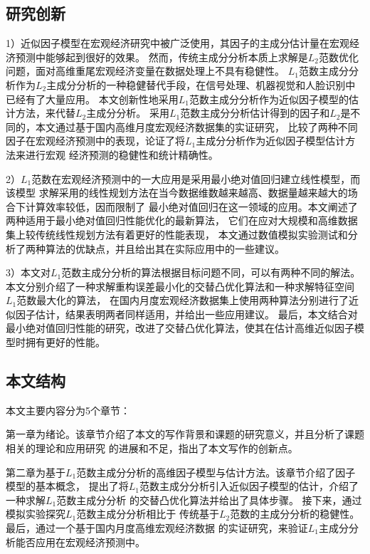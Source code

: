 \subsection{研究创新}
1）近似因子模型在宏观经济研究中被广泛使用，其因子的主成分估计量在宏观经济预测中能够起到很好的效果。
然而，传统主成分分析本质上求解是$L_2$范数优化问题，面对高维重尾宏观经济变量在数据处理上不具有稳健性。
$L_1$范数主成分分析作为$L_2$主成分分析的一种稳健替代手段，在信号处理、机器视觉和人脸识别中
已经有了大量应用。
本文创新性地采用$L_1$范数主成分分析作为近似因子模型的估计方法，来代替$L_2$主成分分析。
采用$L_1$范数主成分分析估计得到的因子和$L_2$是不同的，本文通过基于国内高维月度宏观经济数据集的实证研究，
比较了两种不同因子在宏观经济预测中的表现，论证了将$L_1$主成分分析作为近似因子模型估计方法来进行宏观
经济预测的稳健性和统计精确性。

2）$L_1$范数在宏观经济预测中的一大应用是采用最小绝对值回归建立线性模型，而该模型
求解采用的线性规划方法在当今数据维数越来越高、数据量越来越大的场合下计算效率较低，因而限制了
最小绝对值回归在这一领域的应用。本文阐述了两种适用于最小绝对值回归性能优化的最新算法，
它们在应对大规模和高维数据集上较传统线性规划方法有着更好的性能表现，
本文通过数值模拟实验测试和分析了两种算法的优缺点，并且给出其在实际应用中的一些建议。

3）本文对$L_1$范数主成分分析的算法根据目标问题不同，可以有两种不同的解法。
本文分别介绍了一种求解重构误差最小化的交替凸优化算法和一种求解特征空间$L_1$范数最大化的算法，
在国内月度宏观经济数据集上使用两种算法分别进行了近似因子估计，结果表明两者同样适用，并给出一些应用建议。
最后，本文结合对最小绝对值回归性能的研究，改进了交替凸优化算法，使其在估计高维近似因子模型时拥有更好的性能。

\subsection{本文结构}

本文主要内容分为5个章节：

第一章为绪论。该章节介绍了本文的写作背景和课题的研究意义，并且分析了课题相关的理论和应用研究
的进展和不足，指出了本文写作的创新点。

第二章为基于$L_1$范数主成分分析的高维因子模型与估计方法。该章节介绍了因子模型的基本概念，
提出了将$L_1$范数主成分分析引入近似因子模型的估计，介绍了一种求解$L_1$范数主成分分析
的交替凸优化算法并给出了具体步骤。
接下来，通过模拟实验探究$L_1$范数主成分分析相比于
传统基于$L_2$范数的主成分分析的稳健性。
最后，通过一个基于国内月度高维宏观经济数据
的实证研究，来验证$L_1$主成分分析能否应用在宏观经济预测中。

